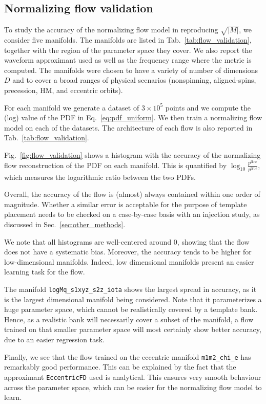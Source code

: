 \documentclass[twocolumn,showpacs,preprintnumbers,nofootinbib,prd,
superscriptaddress,10pt]{revtex4-2}
\begin{document}
\subsection{Normalizing flow validation} \label{sec:flow_validation}

To study the accuracy of the normalizing flow model in reproducing $\sqrt{|M|}$, we consider five manifolds. The manifolds are listed in Tab.~\ref{tab:flow_validation}, together with the region of the parameter space they cover. We also report the waveform approximant used as well as the frequency range where the metric is computed.
The manifolds were chosen to have a variety of number of dimensions $D$ and to cover a broad ranges of physical scenarios (nonspinning, aligned-spins, precession, HM, and eccentric orbits).

For each manifold we generate a dataset of $3\times 10^5$ points and we compute the (log) value of the PDF in Eq.~\eqref{eq:pdf_uniform}. We then train a normalizing flow model on each of the datasets.
The architecture of each flow is also reported in Tab.~\ref{tab:flow_validation}.

Fig.~\ref{fig:flow_validation} shows a histogram with the accuracy of the normalizing flow reconstruction of the PDF on each manifold. This is quantified by $\log_{10}\frac{p^\mathrm{flow}}{p^\mathrm{true}}$, which measures the logarithmic ratio between the two PDFs.

Overall, the accuracy of the flow is (almost) always contained within one order of magnitude. Whether a similar error is acceptable for the purpose of template placement needs to be checked on a case-by-case basis with an injection study, as discussed in Sec.~\ref{sec:other_methods}.

We note that all histograms are well-centered around $0$, showing that the flow does not have a systematic bias. Moreover, the accuracy tends to be higher for low-dimensional manifolds. Indeed, low dimensional manifolds present an easier learning task for the flow.

The manifold \texttt{logMq\_s1xyz\_s2z\_iota} shows the largest spread in accuracy, as it is the largest dimensional manifold being considered. Note that it parameterizes a huge parameter space, which cannot be realistically covered by a template bank. Hence, as a realistic bank will necessarily cover a subset of the manifold, a flow trained on that smaller parameter space will most certainly show better accuracy, due to an easier regression task.

Finally, we see that the flow trained on the eccentric manifold \texttt{m1m2\_chi\_e} has remarkably good performance. This can be explained by the fact that the approximant \texttt{EccentricFD} \cite{lalsuite} used is analytical. This ensures very smooth behaviour across the parameter space, which can be easier for the normalizing flow model to learn.
\end{document}
